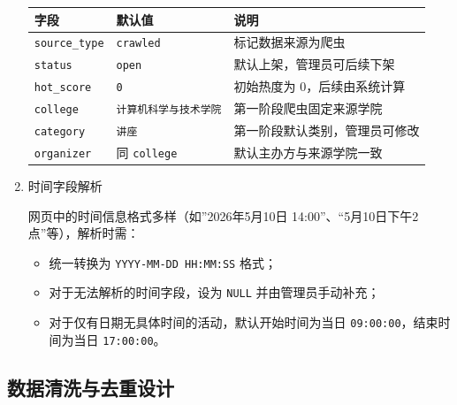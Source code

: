 \documentclass[UTF8,a4paper,12pt,fontset=none]{ctexrep}
\providecommand{\tightlist}{}
\newcounter{none}
\begin{document}
\begin{enumerate}
  {\def\LTcaptype{none} %
  \begin{longtable}[]{@{}lll@{}}
  \toprule\noalign{}
  字段 & 默认值 & 说明 \\
  \midrule\noalign{}
  \endhead
  \bottomrule\noalign{}
  \endlastfoot
  \texttt{source\_type} & \texttt{\textquotesingle{}crawled\textquotesingle{}} & 标记数据来源为爬虫 \\
  \texttt{status} & \texttt{\textquotesingle{}open\textquotesingle{}} & 默认上架，管理员可后续下架 \\
  \texttt{hot\_score} & \texttt{0} & 初始热度为 0，后续由系统计算 \\
  \texttt{college} & \texttt{\textquotesingle{}计算机科学与技术学院\textquotesingle{}} & 第一阶段爬虫固定来源学院 \\
  \texttt{category} & \texttt{\textquotesingle{}讲座\textquotesingle{}} & 第一阶段默认类别，管理员可修改 \\
  \texttt{organizer} & 同 \texttt{college} & 默认主办方与来源学院一致 \\
  \end{longtable}
  }
\item
  时间字段解析

  网页中的时间信息格式多样（如''2026年5月10日 14:00''、``5月10日下午2点''等），解析时需：

  \begin{itemize}
  \tightlist
  \item
    统一转换为 \texttt{YYYY-MM-DD\ HH:MM:SS} 格式；
  \item
    对于无法解析的时间字段，设为 \texttt{NULL} 并由管理员手动补充；
  \item
    对于仅有日期无具体时间的活动，默认开始时间为当日 \texttt{09:00:00}，结束时间为当日 \texttt{17:00:00}。
  \end{itemize}
\end{enumerate}

\subsection{数据清洗与去重设计}\label{ux6570ux636eux6e05ux6d17ux4e0eux53bbux91cdux8bbeux8ba1}
\end{document}
